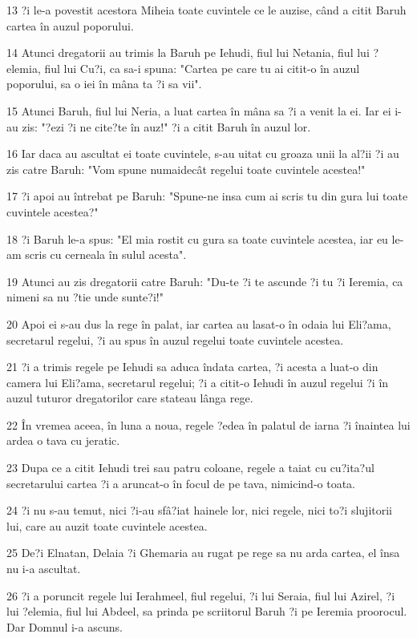 \par 13 ?i le-a povestit acestora Miheia toate cuvintele ce le auzise, când a citit Baruh cartea în auzul poporului.
\par 14 Atunci dregatorii au trimis la Baruh pe Iehudi, fiul lui Netania, fiul lui ?elemia, fiul lui Cu?i, ca sa-i spuna: "Cartea pe care tu ai citit-o în auzul poporului, sa o iei în mâna ta ?i sa vii".
\par 15 Atunci Baruh, fiul lui Neria, a luat cartea în mâna sa ?i a venit la ei. Iar ei i-au zis: "?ezi ?i ne cite?te în auz!" ?i a citit Baruh în auzul lor.
\par 16 Iar daca au ascultat ei toate cuvintele, s-au uitat cu groaza unii la al?ii ?i au zis catre Baruh: "Vom spune numaidecât regelui toate cuvintele acestea!"
\par 17 ?i apoi au întrebat pe Baruh: "Spune-ne insa cum ai scris tu din gura lui toate cuvintele acestea?"
\par 18 ?i Baruh le-a spus: "El mia rostit cu gura sa toate cuvintele acestea, iar eu le-am scris cu cerneala în sulul acesta".
\par 19 Atunci au zis dregatorii catre Baruh: "Du-te ?i te ascunde ?i tu ?i Ieremia, ca nimeni sa nu ?tie unde sunte?i!"
\par 20 Apoi ei s-au dus la rege în palat, iar cartea au lasat-o în odaia lui Eli?ama, secretarul regelui, ?i au spus în auzul regelui toate cuvintele acestea.
\par 21 ?i a trimis regele pe Iehudi sa aduca îndata cartea, ?i acesta a luat-o din camera lui Eli?ama, secretarul regelui; ?i a citit-o Iehudi în auzul regelui ?i în auzul tuturor dregatorilor care stateau lânga rege.
\par 22 În vremea aceea, în luna a noua, regele ?edea în palatul de iarna ?i înaintea lui ardea o tava cu jeratic.
\par 23 Dupa ce a citit Iehudi trei sau patru coloane, regele a taiat cu cu?ita?ul secretarului cartea ?i a aruncat-o în focul de pe tava, nimicind-o toata.
\par 24 ?i nu s-au temut, nici ?i-au sfâ?iat hainele lor, nici regele, nici to?i slujitorii lui, care au auzit toate cuvintele acestea.
\par 25 De?i Elnatan, Delaia ?i Ghemaria au rugat pe rege sa nu arda cartea, el însa nu i-a ascultat.
\par 26 ?i a poruncit regele lui Ierahmeel, fiul regelui, ?i lui Seraia, fiul lui Azirel, ?i lui ?elemia, fiul lui Abdeel, sa prinda pe scriitorul Baruh ?i pe Ieremia proorocul. Dar Domnul i-a ascuns.
